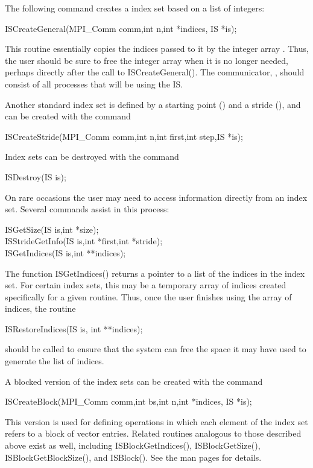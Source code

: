 The following command creates a index set based on a list 
of integers: 
\begin{tabbing}
  ISCreateGeneral(MPI\_Comm comm,int n,int *indices, IS *is);
\end{tabbing}
This routine essentially copies the  indices passed 
to it by the integer array .  
Thus, the user should be sure to free the integer array  
when it is no longer needed, perhaps directly after the call to 
ISCreateGeneral(). The communicator, , should consist of all 
processes that will be using the IS.

Another standard index set is defined by a starting point () and a
stride (),  and can be created with the command
\begin{tabbing}
  ISCreateStride(MPI\_Comm comm,int n,int first,int step,IS *is);
\end{tabbing}

Index sets can be destroyed with the command 
\begin{tabbing}
  ISDestroy(IS is); 
\end{tabbing}

On rare occasions the user may need to access information directly 
from an index set.  
Several commands  
assist in this process:
\begin{tabbing}
  ISGetSize(IS is,int *size);\\
  ISStrideGetInfo(IS is,int *first,int *stride);\\
  ISGetIndices(IS is,int **indices);
\end{tabbing}
The function ISGetIndices() returns a pointer to a list of the 
indices in the index set. 
For certain index sets, this may be a 
temporary array of indices created specifically for a given routine. 
Thus, once the user finishes using the array of indices, 
the routine 
\begin{tabbing}
  ISRestoreIndices(IS is, int **indices); 
\end{tabbing}
should be called to ensure that the system can free the space it 
may have used to generate the list of indices.

A blocked version of the index sets can be created with the command
\begin{tabbing}
  ISCreateBlock(MPI\_Comm comm,int bs,int n,int *indices, IS *is);
\end{tabbing}
This version is used for defining operations in which each element of the index
set refers to a block of  vector entries.  Related routines analogous
to those described above exist as well, including
ISBlockGetIndices(), ISBlockGetSize(), ISBlockGetBlockSize(),
and ISBlock(). See the man pages for details.
  

